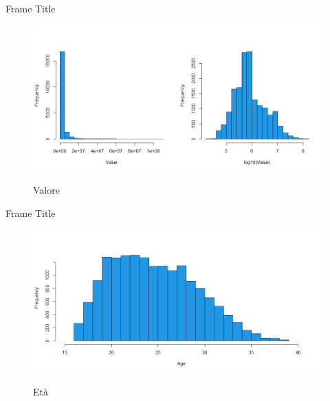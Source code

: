 \documentclass[aspectratio=169,xcolor=dvipsnames]{beamer}
\begin{document}
\begin{frame}{Frame Title}
\begin{figure}[H] 
\begin{center} 
  \includegraphics[width=12.5cm]{Rplot1.png}\\ 
  \caption{Valore} 
\end{center} 
\end{figure}
\end{frame}


\begin{frame}{Frame Title}
\begin{figure}[H] 
\begin{center} 
  \includegraphics[width=11cm]{Rplot2.png}\\ 
  \caption{Età} 
\end{center} 
\end{figure}
\end{frame}

\end{document}
